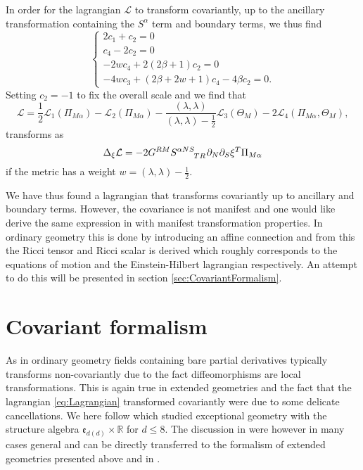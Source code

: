 In order for the lagrangian $\mathcal{L}$ to transform covariantly, up to the ancillary transformation containing the $S^\alpha$ term and boundary terms, we thus find 
\begin{equation}
    \begin{cases}
        2c_1+c_2 = 0\\
        c_4-2c_2 = 0\\
        -2wc_4+2(2\beta+1)c_2 = 0\\
        -4wc_3+(2\beta+2w+1)c_4-4\beta c_2 = 0.
    \end{cases}
\end{equation}
Setting $c_2=-1$ to fix the overall scale and we find that 
\begin{equation}\label{eq:Lagrangian}
    \mathcal{L} = \frac{1}{2}\mathcal{L}_1(\Pi_{M\alpha})-\mathcal{L}_2(\Pi_{M\alpha})-\frac{(\lambda,\lambda)}{(\lambda,\lambda)-\frac{1}{2}}\mathcal{L}_3(\Theta_M)-2\mathcal{L}_4(\Pi_{M\alpha},\Theta_M),
\end{equation}
transforms as 
\begin{equation}
    \Delta_\xi \mathcal{L} = -2G^{RM}\tensor{S}{^{\alpha NS}_{TR}}\pd_N\pd_S\xi^T\Pi_{M\alpha}
\end{equation}
if the metric has a weight $w=(\lambda,\lambda)-\frac{1}{2}$. 

We have thus found a lagrangian that transforms covariantly up to ancillary and boundary terms. However, the covariance is not manifest and one would like derive the same expression in with manifest transformation properties. In ordinary geometry this is done by introducing an affine connection and from this the Ricci tensor and Ricci scalar is derived which roughly corresponds to the equations of motion and the Einstein-Hilbert lagrangian respectively. An attempt to do this will be presented in section \ref{sec:CovariantFormalism}. 

\section{Covariant formalism\label{sec:CovariantFormalism}}
As in ordinary geometry fields containing bare partial derivatives typically transforms non-covariantly due to the fact diffeomorphisms are local transformations. This is again true in extended geometries and the fact that the lagrangian \eqref{eq:Lagrangian} transformed covariantly were due to some delicate cancellations. We here follow \cite{Cederwall:2013naa} which studied exceptional geometry with the structure algebra $\mathfrak{e}_{d(d)}\times\mathbb{R}$ for $d\leq 8$. The discussion in \cite{Cederwall:2013naa} were however in many cases general and can be directly transferred to the formalism of extended geometries presented above and in \cite{CederwallPalmkvist2017}.


